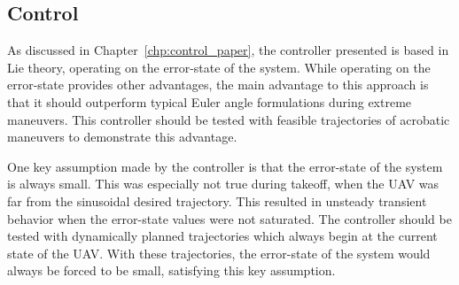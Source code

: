 

\subsection{Control}
As discussed in Chapter~\ref{chp:control_paper}, the controller presented is
based in Lie theory, operating on the error-state of the system.
While operating on the error-state provides other
advantages, the main advantage to this approach is that it should
outperform typical Euler angle formulations during extreme maneuvers.
This controller should be tested with feasible trajectories of acrobatic
maneuvers to demonstrate this advantage.

One key assumption made by the controller is that the
error-state of the system is always small. This was
especially not true during takeoff, when the UAV was far from the sinusoidal
desired trajectory.
This resulted in unsteady transient behavior when the error-state values were
not saturated.
The controller should be tested with
dynamically planned trajectories which always begin at the current state of the
UAV. With these trajectories, the error-state of the system would always be forced to
be small, satisfying this key assumption.


